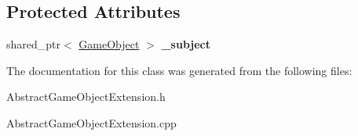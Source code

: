 \subsection*{Protected Attributes}
\begin{DoxyCompactItemize}
\item 
\mbox{\label{class_abstract_game_object_extension_a4fb454cd6286777bdf6804239dc93e51}} 
shared\+\_\+ptr$<$ \mbox{\hyperlink{class_game_object}{Game\+Object}} $>$ {\bfseries \+\_\+subject}
\end{DoxyCompactItemize}


The documentation for this class was generated from the following files\+:\begin{DoxyCompactItemize}
\item 
Abstract\+Game\+Object\+Extension.\+h\item 
Abstract\+Game\+Object\+Extension.\+cpp\end{DoxyCompactItemize}
